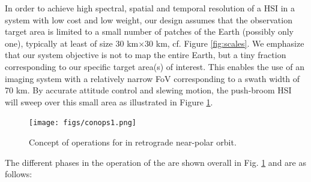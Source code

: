 In order to achieve high spectral, spatial and temporal resolution of
a HSI in a \sml system with low cost and low weight, our \hypso design
assumes that the observation target area is limited to a small
number of patches of the Earth (possibly only one), typically at least of size
30 km$\times$30 km, cf. Figure \ref{fig:scales}. We emphasize that our
system objective is not to map the entire Earth, but a tiny fraction
corresponding to our specific target area(s) of interest. This enables
the use of an imaging system with a relatively narrow FoV corresponding to a swath width of 70 km. By accurate attitude
control and slewing motion, the push-broom HSI will sweep over this
small area as illustrated in Figure \ref{fig:conops1}.

\begin{figure}[tbhp]
  \begin{center}
    \texttt{[image: figs/conops1.png]}
    \caption{Concept of operations for \hypsoe in retrograde near-polar orbit.}
    \label{fig:conops1}
\end{center}
\end{figure}

The different phases in the operation of the \hypso are shown overall in Fig. \ref{fig:conops1} and are as follows:

